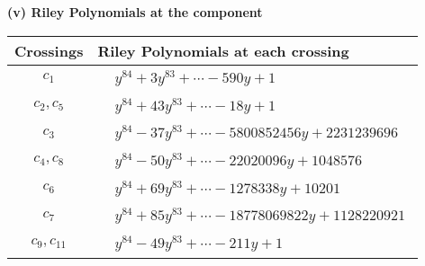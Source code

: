 \documentclass[1p]{elsarticle_modified}
\theoremstyle{definition}
\begin{document}
\newpage\renewcommand{\arraystretch}{1}
\flushleft \textbf{(v) Riley Polynomials at the component}\newline \\
\begin{tabular}{m{50pt}|m{274pt}}
Crossings & \hspace{64pt}Riley Polynomials at each crossing \\
\hline $$\begin{aligned}c_{1}\end{aligned}$$&$\begin{aligned}
&y^{84}+3 y^{83}+\cdots-590 y+1
\end{aligned}$\\
\hline $$\begin{aligned}c_{2},c_{5}\end{aligned}$$&$\begin{aligned}
&y^{84}+43 y^{83}+\cdots-18 y+1
\end{aligned}$\\
\hline $$\begin{aligned}c_{3}\end{aligned}$$&$\begin{aligned}
&y^{84}-37 y^{83}+\cdots-5800852456 y+2231239696
\end{aligned}$\\
\hline $$\begin{aligned}c_{4},c_{8}\end{aligned}$$&$\begin{aligned}
&y^{84}-50 y^{83}+\cdots-22020096 y+1048576
\end{aligned}$\\
\hline $$\begin{aligned}c_{6}\end{aligned}$$&$\begin{aligned}
&y^{84}+69 y^{83}+\cdots-1278338 y+10201
\end{aligned}$\\
\hline $$\begin{aligned}c_{7}\end{aligned}$$&$\begin{aligned}
&y^{84}+85 y^{83}+\cdots-18778069822 y+1128220921
\end{aligned}$\\
\hline $$\begin{aligned}c_{9},c_{11}\end{aligned}$$&$\begin{aligned}
&y^{84}-49 y^{83}+\cdots-211 y+1
\end{aligned}$\\

\end{tabular}
\end{document}
